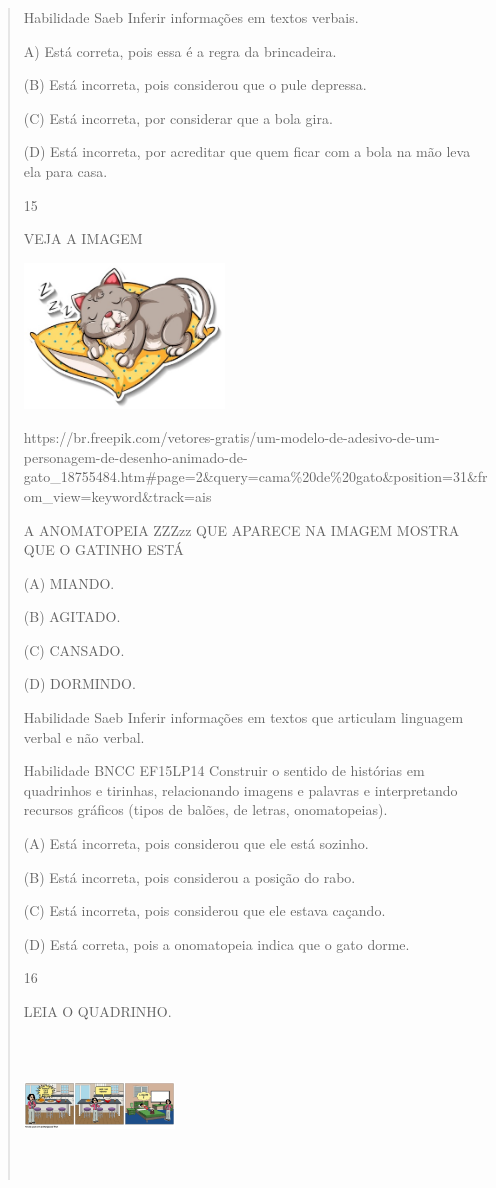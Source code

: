 {{{{\begin{verse}
{{\begin{escolha}
{{{{{Habilidade Saeb Inferir informações em textos verbais.

A) Está correta, pois essa é a regra da brincadeira.

(B) Está incorreta, pois considerou que o pule depressa.

(C) Está incorreta, por considerar que a bola gira.

(D) Está incorreta, por acreditar que quem ficar com a bola na mão leva
ela para casa.

\num{15}

VEJA A IMAGEM

\includegraphics[width=2.09091in,height=1.52916in]{media/image161.jpeg}

https://br.freepik.com/vetores-gratis/um-modelo-de-adesivo-de-um-personagem-de-desenho-animado-de-gato\_18755484.htm\#page=2\&query=cama\%20de\%20gato\&position=31\&from\_view=keyword\&track=ais

A ANOMATOPEIA ZZZzz QUE APARECE NA IMAGEM MOSTRA QUE O GATINHO ESTÁ

(A) MIANDO.

(B) AGITADO.

(C) CANSADO.

(D) DORMINDO.

Habilidade Saeb Inferir informações em textos que articulam linguagem
verbal e não verbal.

Habilidade BNCC EF15LP14 Construir o sentido de histórias em quadrinhos
e tirinhas, relacionando imagens e palavras e interpretando recursos
gráficos (tipos de balões, de letras, onomatopeias).

(A) Está incorreta, pois considerou que ele está sozinho.

(B) Está incorreta, pois considerou a posição do rabo.

(C) Está incorreta, pois considerou que ele estava caçando.

(D) Está correta, pois a onomatopeia indica que o gato dorme.

\num{16}

LEIA O QUADRINHO.

\includegraphics[width=1.57333in,height=1.45456in]{media/image162.png}

}}}}}
\end{escolha}}}
\end{verse}}}}}
